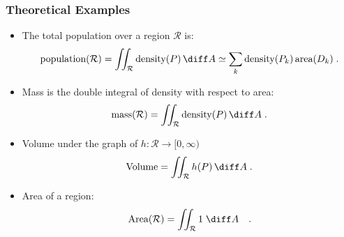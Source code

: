\begin{frame}
\frametitle{Theoretical Examples}
\begin{itemize}
\item The total population over a region $\mathcal{R}$ is:
\[
\text{population}(\mathcal{R}) = \iint_{\mathcal{R}} \text{density}(P) \, \diff A \simeq \sum_k \text{density}(P_k) \, \text{area}(D_k) \; .
\]
\item<2-> Mass is the double integral of density with respect to area:
\[
\text{mass}(\mathcal{R}) = \iint_{\mathcal{R}} \text{density}(P) \, \diff A\; .
\]
\item<3-> Volume under the graph of $h\colon \mathcal{R} \to [0,\infty)$
\[
\text{Volume} = \iint_{\mathcal{R}} h(P) \, \diff A \; .
\]
\item<4-> Area of a region:
\[
\text{Area}(\mathcal{R}) = \iint_{\mathcal{R}} 1 \; \diff A\quad .
\]
\end{itemize}
\end{frame}